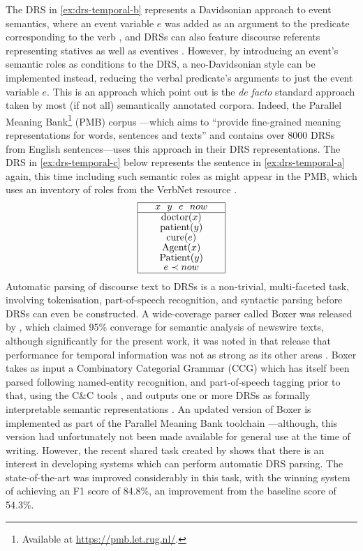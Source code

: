 \documentclass[a4paper,12pt,leqno,twoside]{article}
\def\drs#1#2{
\renewcommand{\arraystretch}{0.8}
\begin{tabular}[c]{|>{\hspace{1pc}}c<{\hspace{1pc}}|}
	\hline #1 \\
	\hline #2 \\
	\hline
\end{tabular}
\renewcommand{\arraystretch}{1}
}
\begin{document}
The DRS in \cref{ex:drs-temporal-b} represents a Davidsonian approach to event semantics, where an event variable $e$ was added as an argument to the predicate corresponding to the verb \citep{davidson1967logical,Kamp1993}, and DRSs can also feature discourse referents representing statives as well as eventives \citep[p. 103]{kamp1988discourse}. However, by introducing an event's semantic roles as conditions to the DRS, a neo-Davidsonian style \citep{dowty1989semantic} can be implemented instead, reducing the verbal predicate's arguments to just the event variable $e$. This is an approach which \citet{abzianidze2019thirty,Bunt2020} point out is the \textit{de facto} standard approach taken by most (if not all) semantically annotated corpora. Indeed, the Parallel Meaning Bank\footnote{Available at \url{https://pmb.let.rug.nl/}.} (PMB) corpus \citep{abzianidze2017parallel}---which aims to ``provide fine-grained meaning representations for words, sentences and texts'' and contains over 8000 DRSs from English sentences---uses this approach in their DRS representations. The DRS in \cref{ex:drs-temporal-c} below represents the sentence in \cref{ex:drs-temporal-a} again, this time including such semantic roles as might appear in the PMB, which uses an inventory of roles from the VerbNet resource \citep{schuler2005verbnet}.
\begin{align}
	\drs{$x~~y~~e~~now$}{doctor($x$)\\patient($y$)\\cure($e$)\\Agent($x$)\\Patient($y$)\\$e \prec now$}\label{ex:drs-temporal-c}
\end{align}
Automatic parsing of discourse text to DRSs is a non-trivial, multi-faceted task, involving tokenisation, part-of-speech recognition, and syntactic parsing before DRSs can even be constructed. A wide-coverage parser called Boxer was released by \citet{Bos2008}, which claimed 95\% converage for semantic analysis of newswire texts, although significantly for the present work, it was noted in that release that performance for temporal information was not as strong as its other areas \citep[pp. 283--285]{Bos2008}. Boxer takes as input a Combinatory Categorial Grammar (CCG) \citep{steedman2000syntactic,steedman2011combinatory} which has itself been parsed following named-entity recognition, and part-of-speech tagging prior to that, using the C\&C tools \citep{curran2007linguistically}, and outputs one or more DRSs as formally interpretable semantic representations \citep[p. 285]{Bos2008}. An updated version of Boxer \citep{van-noord-etal-2018-exploring} is implemented as part of the Parallel Meaning Bank toolchain \citep{abzianidze2017parallel}---although, this version had unfortunately not been made available for general use at the time of writing. However, the recent shared task created by \citep{abzianidze2019first} shows that there is an interest in developing systems which can perform automatic DRS parsing. The state-of-the-art was improved considerably in this task, with the winning system of \citet{liu2019discourse} achieving an F1 score of 84.8\%, an improvement from the baseline score of 54.3\%.
\end{document}
